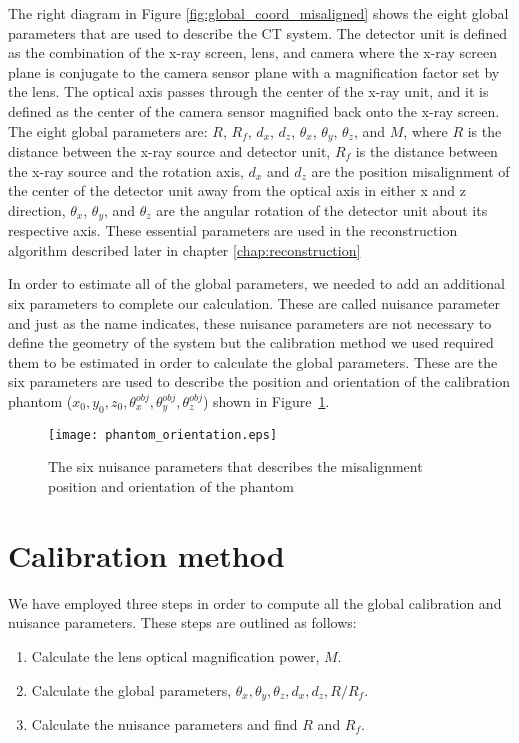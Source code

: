 The right diagram in Figure \ref{fig:global_coord_misaligned} shows the eight global parameters that are used to describe the CT system.  The detector unit is defined as the combination of the x-ray screen, lens, and camera where the x-ray screen plane is conjugate to the camera sensor plane with a magnification factor set by the lens.  The optical axis passes through the center of the x-ray unit, and it is defined as the center of the camera sensor magnified back onto the x-ray screen.  The eight global parameters are: $R$, $R_f$, $d_x$, $d_z$, $\theta_x$, $\theta_y$, $\theta_z$, and $M$, where $R$ is the distance between the x-ray source and detector unit, $R_f$ is the distance between the x-ray source and the rotation axis, $d_x$ and $d_z$ are the position misalignment of the center of the detector unit away from the optical axis in either x and z direction, $\theta_x$, $\theta_y$, and $\theta_z$ are the angular rotation of the detector unit about its respective axis.  These essential parameters are used in the reconstruction algorithm described later in chapter \ref{chap:reconstruction}

In order to estimate all of the global parameters, we needed to add an additional six parameters to complete our calculation.  These are called nuisance parameter and just as the name indicates, these nuisance parameters are not necessary to define the geometry of the system but the calibration method we used required them to be estimated in order to calculate the global parameters.  These are the six parameters are used to describe the position and orientation of the calibration phantom ($x_0, y_0, z_0, \theta^{obj}_x, \theta_y^{obj}, \theta_z^{obj}$) shown in Figure~\ref{fig:phantom_orientation}.  

\begin{figure}[ht]
\centering
\texttt{[image: phantom\_orientation.eps]}
\caption{The six nuisance parameters that describes the misalignment position and orientation of the phantom}
\label{fig:phantom_orientation}
\end{figure}

\section{Calibration method}
\label{section:calibration_method}
We have employed three steps in order to compute all the global calibration and nuisance parameters.  These steps are outlined as follows:

\begin{enumerate}
\item Calculate the lens optical magnification power, $M$.
\item Calculate the global parameters, $\theta_x, \theta_y, \theta_z, d_x, d_z, R/R_f$.
\item Calculate the nuisance parameters and find $R$ and $R_f$.
\end{enumerate}

